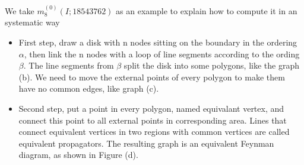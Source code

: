 \documentclass{beamer}
\begin{document}
\begin{frame}
    We take $m_8^{(0)}(I;18543762)$ as an example to explain how to compute it in an systematic way
    \begin{itemize}
        \item First step, draw a disk with n nodes sitting on the boundary in the ordering $\alpha$, then link the n nodes with a loop of line segments according to
              the ording $\beta$. The line segments from $\beta$ split the disk into some polygons, like the graph (b). We need to move the external points of every polygon
              to make them have no common edges, like graph (c).
        \item Second step, put a point in every polygon, named equivalant vertex, and connect this point to all external points in corresponding area. Lines that connect equivalent 
              vertices in two regions with common vertices are called equivalent propagators. The resulting graph is an equivalent Feynman diagram, as shown in Figure (d).
    \end{itemize}
\end{frame}
\end{document}
